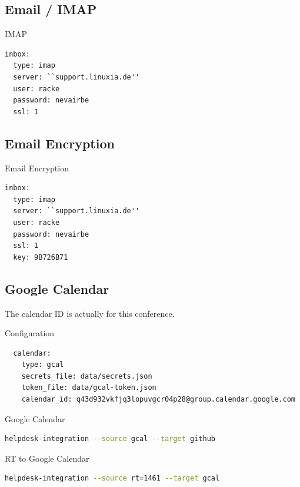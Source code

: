 \subsection{Email / IMAP}

\begin{frame}[fragile]{IMAP}
\begin{lstlisting}
inbox:
  type: imap
  server: ``support.linuxia.de''
  user: racke
  password: nevairbe
  ssl: 1
\end{lstlisting}
\end{frame}

\subsection{Email Encryption}
\begin{frame}[fragile]{Email Encryption}
\begin{lstlisting}
inbox:
  type: imap
  server: ``support.linuxia.de''
  user: racke
  password: nevairbe
  ssl: 1
  key: 9B726B71
\end{lstlisting}
\end{frame}

\subsection{Google Calendar}

The calendar ID is actually for this conference.

\begin{frame}[fragile]{Configuration}
\begin{lstlisting}
  calendar:
    type: gcal
    secrets_file: data/secrets.json
    token_file: data/gcal-token.json
    calendar_id: q43d932vkfjq3lopuvgcr04p28@group.calendar.google.com
\end{lstlisting}
\end{frame}

\begin{frame}[fragile]{Google Calendar}
\begin{lstlisting}[language=bash]
helpdesk-integration --source gcal --target github
\end{lstlisting}
\end{frame}

\begin{frame}[fragile]{RT to Google Calendar}
\begin{lstlisting}[language=bash]
helpdesk-integration --source rt=1461 --target gcal
\end{lstlisting}
\end{frame}

